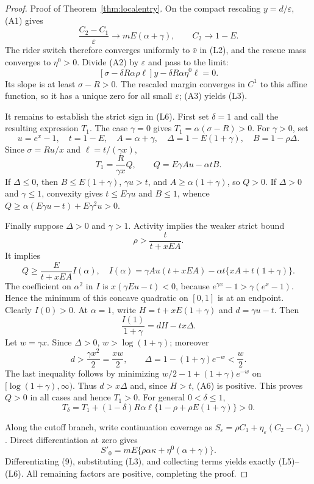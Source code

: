 \documentclass[mnsc,dblanonrev]{informs4}
\begin{document}
\begin{APPENDICES}
\begin{proof}{Proof of Theorem~\ref{thm:localentry}.}
On the compact rescaling $y=d/\varepsilon$, (A1) gives
\[
 \frac{C_2-C_1}{\varepsilon}\to mE(\alpha+\gamma),\qquad
 C_2\to1-E.
\]
The rider switch therefore converges uniformly to $\bar v$ in (L2), and the
rescue mass converges to $\eta^0>0$.  Divide (A2) by $\varepsilon$ and pass
to the limit:
\[
 [\sigma-\delta R\alpha\rho\ell]y
 -\delta R\alpha\eta^0\ell=0.                             \tag{A3}
\]
Its slope is at least $\sigma-R>0$.  The rescaled margin converges in $C^1$ to
this affine function, so it has a unique zero for all small
$\varepsilon$; (A3) yields (L3).

It remains to establish the strict sign in (L6).  First set $\delta=1$ and
call the resulting expression $T_1$.  The case $\gamma=0$ gives
$T_1=\alpha(\sigma-R)>0$.  For $\gamma>0$, set
\[
 u=e^x-1,\quad t=1-E,\quad A=\alpha+\gamma,\quad
 \Delta=1-E(1+\gamma),\quad B=1-\rho\Delta.
\]
Since $\sigma=Ru/x$ and $\ell=t/(\gamma x)$,
\[
 T_1=\frac{R}{\gamma x}Q,\qquad
 Q=E\gamma Au-\alpha tB.                                   \tag{A4}
\]
If $\Delta\le0$, then $B\le E(1+\gamma)$,
$\gamma u>t$, and $A\ge\alpha(1+\gamma)$, so $Q>0$.  If
$\Delta>0$ and $\gamma\le1$, convexity gives
$t\le E\gamma u$ and $B\le1$, whence
$Q\ge\alpha(E\gamma u-t)+E\gamma^2u>0$.

Finally suppose $\Delta>0$ and $\gamma>1$.  Activity implies the weaker
strict bound
\[
 \rho>\frac{t}{t+xEA}.
\]
It implies
\[
 Q\ge\frac{E}{t+xEA}I(\alpha),\quad
 I(\alpha)=\gamma Au(t+xEA)-\alpha t\{xA+t(1+\gamma)\}.
                                                                    \tag{A5}
\]
The coefficient on $\alpha^2$ in $I$ is
$x(\gamma Eu-t)<0$, because
$e^{\gamma x}-1>\gamma(e^x-1)$.  Hence the minimum of this concave quadratic
on $[0,1]$ is at an endpoint.  Clearly $I(0)>0$.  At $\alpha=1$, write
$H=t+xE(1+\gamma)$ and $d=\gamma u-t$.  Then
\[
 \frac{I(1)}{1+\gamma}=dH-tx\Delta.                         \tag{A6}
\]
Let $w=\gamma x$.  Since $\Delta>0$, $w>\log(1+\gamma)$; moreover
\[
 d>\frac{\gamma x^2}{2}=\frac{xw}{2},\qquad
 \Delta=1-(1+\gamma)e^{-w}<\frac w2.
\]
The last inequality follows by minimizing
$w/2-1+(1+\gamma)e^{-w}$ on
$[\log(1+\gamma),\infty)$.  Thus $d>x\Delta$ and, since $H>t$,
(A6) is positive.  This proves $Q>0$ in all cases and hence $T_1>0$.
For general $0<\delta\le1$,
\[
 T_\delta=T_1+(1-\delta)R\alpha\ell
 \{1-\rho+\rho E(1+\gamma)\}>0.
\]

Along the cutoff branch, write continuation coverage as
$S_\varepsilon=\rho C_1+\eta_\varepsilon(C_2-C_1)$.  Direct
differentiation at zero gives
\[
 S'_0=mE\{\rho\alpha\kappa+\eta^0(\alpha+\gamma)\}.
\]
Differentiating (9), substituting (L3), and collecting terms yields exactly
(L5)--(L6).  All remaining factors are positive, completing the proof.
\Halmos\end{proof}


\end{APPENDICES}
\end{document}
